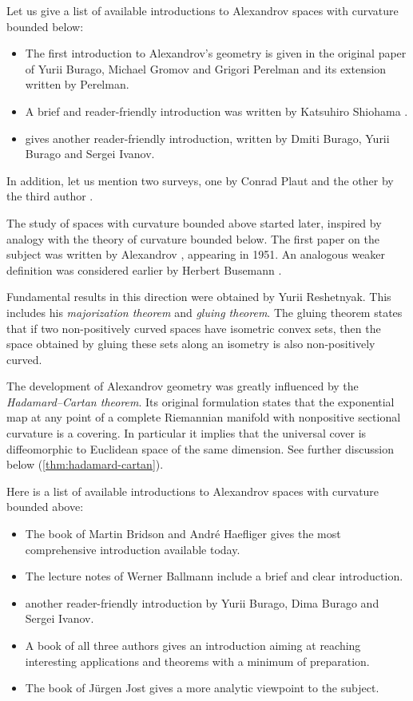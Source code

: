 %
Let us give a list of available introductions to  Alexandrov spaces with curvature bounded below: 
\begin{itemize}
\item The first introduction to Alexandrov's geometry is given in the original paper of Yurii Burago, Michael Gromov and Grigori Perelman \cite{burago-gromov-perelman} 
and its extension \cite{perelman:spaces2} written by Perelman.
\item A brief and reader-friendly introduction was written by Katsuhiro Shiohama \cite[Sections 1--8]{shiohama}.
\item \cite[Chapter 10]{burago-burago-ivanov} gives another reader-friendly introduction, written by Dmiti Burago, Yurii Burago and Sergei Ivanov.
\end{itemize}
In addition, let us mention two surveys, one by Conrad Plaut \cite{plaut:survey} and the other by the third author \cite{petrunin:survey}.

The study of  spaces with curvature bounded above started later,
inspired by analogy with the theory of curvature bounded below.
The first paper on the subject was written by Alexandrov \cite{alexandrov:strong-angle}, appearing in 1951.
An analogous weaker definition was considered earlier by Herbert Busemann \cite{busemann-CBA}.

Fundamental results in this direction were obtained by Yurii Reshetnyak.
This includes his \emph{majorization theorem} and \emph{gluing theorem}.
The gluing theorem states that if two non-positively curved spaces have isometric convex sets, then the space obtained by gluing these sets along an isometry is also non-positively curved.

The development of Alexandrov geometry was greatly influenced by the \emph{Hadamard--Cartan theorem}.
Its original formulation states that the exponential map at any point of a complete Riemannian manifold with nonpositive sectional curvature is a covering.
In particular it implies that the universal cover is diffeomorphic to Euclidean space of the same dimension. 
See further discussion below (\ref{thm:hadamard-cartan}).

Here is a list of available introductions to Alexandrov spaces with curvature bounded above: 
\begin{itemize}
\item The book of Martin Bridson and Andr\'e Haefliger \cite{bridson-haefliger} gives the most comprehensive introduction available today. 
\item The lecture notes of Werner Ballmann \cite{ballmann:lectures} include a brief 
and clear
introduction.
\item \cite[Chapter 9]{burago-burago-ivanov} another reader-friendly introduction by Yurii Burago, Dima Burago and Sergei Ivanov.
\item A book of all three authors \cite{alexander-kapovitch-petrunin-CAT} gives an introduction aiming at reaching interesting applications and theorems with a minimum of preparation.
\item The book of J\"{u}rgen Jost \cite{jost} gives a more analytic viewpoint to the subject.
\end{itemize}

